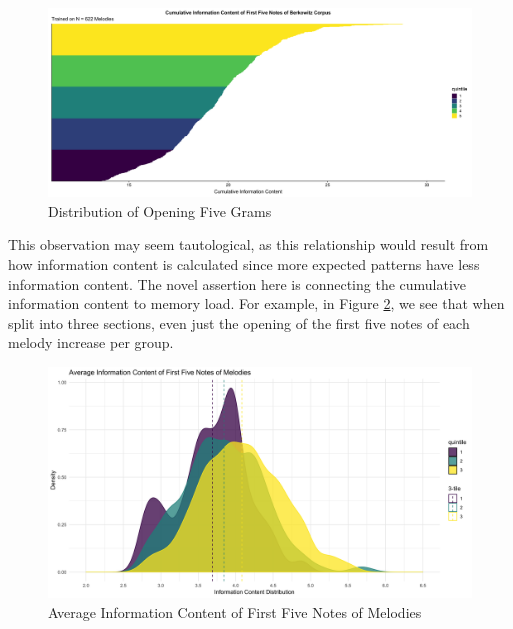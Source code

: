 \documentclass[12pt,]{book}
\begin{document}
\begin{figure}

{\centering \includegraphics[width=1\linewidth]{img/five_incipit_distiribution} 

}

\caption{Distribution of Opening Five Grams}\label{fig:quintdist}
\end{figure}

This observation may seem tautological, as this relationship would result from how information content is calculated since more expected patterns have less information content.
The novel assertion here is connecting the cumulative information content to memory load.
For example, in Figure \ref{fig:tridensity}, we see that when split into three sections, even just the opening of the first five notes of each melody increase per group.

\begin{figure}

{\centering \includegraphics[width=1\linewidth]{img/tri_distribution} 

}

\caption{Average Information Content of First Five Notes of Melodies}\label{fig:tridensity}
\end{figure}
\end{document}
